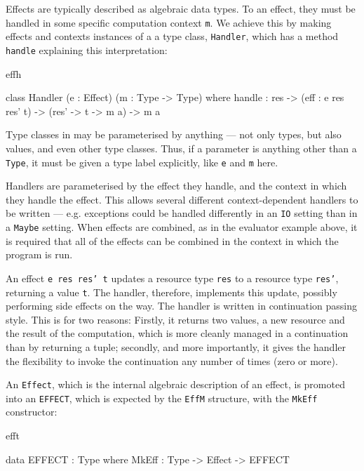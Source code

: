 \noindent
Effects are typically described as algebraic data types. To  an
effect, they must be handled in some specific computation context \texttt{m}.
We achieve this by making effects and contexts instances of a a type class,
\texttt{Handler}, which has a method \texttt{handle} explaining this
interpretation:

\begin{SaveVerbatim}{effh}

class Handler (e : Effect) (m : Type -> Type) where
     handle : res -> (eff : e res res' t) -> 
              (res' -> t -> m a) -> m a

\end{SaveVerbatim}

\noindent
Type classes in \Idris{} may be parameterised by anything --- not only types,
but also values, and even other type classes. Thus, if a parameter is anything
other than a \texttt{Type}, it must be given a type label explicitly, like
\texttt{e} and \texttt{m} here.

Handlers are parameterised by the effect they handle, and the context in which
they handle the effect. This allows several different context-dependent
handlers to be written --- e.g. exceptions could be handled differently in an
\texttt{IO} setting than in a \texttt{Maybe} setting. When effects are combined,
as in the evaluator example above, it is required that all of the effects
can be combined in the context in which the program is run.

An effect \texttt{e res res' t} updates a resource type \texttt{res} to a
resource type \texttt{res'}, returning a value \texttt{t}. The handler, therefore,
implements this update, possibly performing side effects on the way.
The handler is written in continuation passing style. This is for two reasons:
Firstly, it returns two values, a new resource and the result of the computation,
which is more cleanly managed in a continuation than by returning a tuple;
secondly, and more importantly, it gives the handler the flexibility to invoke
the continuation any number of times (zero or more).

An \texttt{Effect}, which is the internal algebraic description of an effect,
is promoted into an \texttt{EFFECT}, which is expected by the \texttt{EffM}
structure, with the \texttt{MkEff} constructor:

\begin{SaveVerbatim}{efft}

data EFFECT : Type where
     MkEff : Type -> Effect -> EFFECT

\end{SaveVerbatim}

